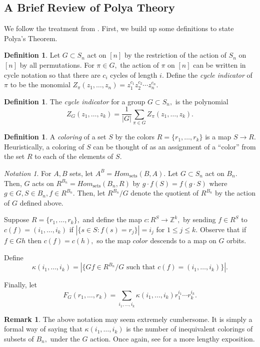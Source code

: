 \documentclass[10 pt]{amsart}
\theoremstyle{plain}
\theoremstyle{definition}
\newtheorem{defn}[thm]{Definition}
\newtheorem{rem}[thm]{Remark}
\theoremstyle{remark}
\newtheorem{note}[thm]{Notation}
\numberwithin{equation}{section}
\newcommand\ssec{\subsection}
\newcommand\BBZ{{\mathbb Z}}
\begin{document}
\ssec{A Brief Review of Polya Theory}

We follow the treatment from \cite[Chapter 7]{algebraic_stanley}. First, we build up some definitions to state Polya's Theorem.

\begin{defn}
Let $G \subset S_n$ act on $[n]$ by the restriction of the action of $S_n$ on $[n]$ by all permutations. For $\pi \in G,$ the action of $\pi$ on $[n]$ can be written in cycle notation so that there are $c_i$ cycles of length $i.$ Define the {\it cycle indicator} of $\pi$ to be the monomial $Z_\pi(z_1,\ldots, z_n) = z_1^{c_1}z_2^{c_2}\cdots z_n^{c_n}.$
\end{defn}

\begin{defn}
The {\it cycle indicator} for a group $G \subset S_n,$ is the polynomial $$Z_G(z_1,\ldots, z_k) = \frac{1}{|G|}\sum_{\pi \in G} Z_\pi(z_1,\ldots, z_k).$$
\end{defn}

\begin{defn}
A {\it coloring} of a set $S$ by the colors $R = \{r_1,\ldots, r_k\}$ is a map $S \rightarrow R.$ Heuristically, a coloring of $S$ can be thought of as an assignment of a ``color'' from the set $R$ to each of the elements of $S.$
\end{defn}

\begin{note}
For $A,B$ sets, let $A^B = Hom_{\text{sets}}(B,A).$ Let $G \subset S_n$ act on $B_n.$ Then, $G$ acts on $R^{B_n} = Hom_{\text{sets}}(B_n,R)$ by $g \cdot f(S) = f(g\cdot S)$ where $g \in G,S \in B_n, f \in R^{B_n}.$ Then, let $R^{B_n}/G$ denote the quotient of $R^{B_n}$ by the action of $G$ defined above.

Suppose $R = \{r_1,\ldots, r_k\},$ and define the map $c:R^{S}\rightarrow \BBZ^k,$ by sending $f \in R^S$ to $c(f) = (i_1,\ldots, i_k)$ if $|\{s \in S\colon f(s) = r_j\}| = i_j$ for $1 \leq j \leq k.$ Observe that if $f \in Gh$ then $c(f) = c(h),$ so the map $color$ descends to a map on $G$ orbits.

Define $$\kappa(i_1,\ldots, i_k) = |\{Gf \in R^{B_n}/G \text{ such that } c(f) = (i_1,\ldots, i_k) \}|.$$

Finally, let 
$$F_G(r_1,\ldots, r_k) = \sum_{i_1,\ldots, i_k} \kappa(i_1,\ldots, i_k)r_1^{i_1} \cdots r_k^{i_k}.$$
\end{note}

\begin{rem}
The above notation may seem extremely cumbersome. It is simply a formal way of saying that $\kappa(i_1,\ldots, i_k)$ is the number of inequivalent colorings of subsets of $B_n,$ under the $G$ action. Once again, see \cite[Chapter 7]{algebraic_stanley} for a more lengthy exposition.
\end{rem}
\end{document}
